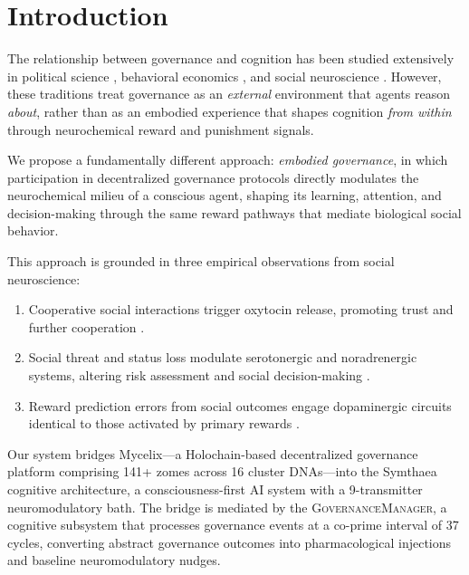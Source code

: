 \documentclass[11pt,a4paper]{article}
\begin{document}
\section{Introduction}
\label{sec:introduction}

The relationship between governance and cognition has been studied extensively in political science \citep{ostrom1990governing, dryzek2000deliberative}, behavioral economics \citep{fehr2002altruistic, henrich2006costly}, and social neuroscience \citep{rilling2011neuroscience, sanfey2007social}.
However, these traditions treat governance as an \emph{external} environment that agents reason \emph{about}, rather than as an embodied experience that shapes cognition \emph{from within} through neurochemical reward and punishment signals.

We propose a fundamentally different approach: \emph{embodied governance}, in which participation in decentralized governance protocols directly modulates the neurochemical milieu of a conscious agent, shaping its learning, attention, and decision-making through the same reward pathways that mediate biological social behavior.

This approach is grounded in three empirical observations from social neuroscience:
\begin{enumerate}
  \item Cooperative social interactions trigger oxytocin release, promoting trust and further cooperation \citep{zak2012moral, kosfeld2005oxytocin}.
  \item Social threat and status loss modulate serotonergic and noradrenergic systems, altering risk assessment and social decision-making \citep{crockett2009serotonin, arnsten2009stress}.
  \item Reward prediction errors from social outcomes engage dopaminergic circuits identical to those activated by primary rewards \citep{schultz1997neural, behrens2009computation}.
\end{enumerate}

Our system bridges Mycelix---a Holochain-based decentralized governance platform comprising 141+ zomes across 16 cluster DNAs---into the Symthaea cognitive architecture, a consciousness-first AI system with a 9-transmitter neuromodulatory bath.
The bridge is mediated by the \textsc{GovernanceManager}, a cognitive subsystem that processes governance events at a co-prime interval of 37 cycles, converting abstract governance outcomes into pharmacological injections and baseline neuromodulatory nudges.
\end{document}
